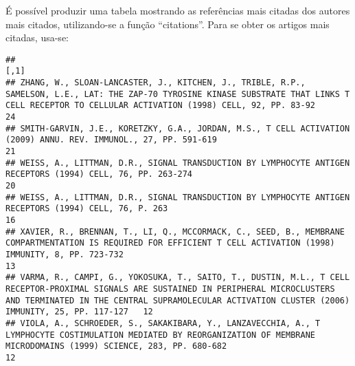 \documentclass[]{article}
\newenvironment{Shaded}{\begin{snugshade}}{\end{snugshade}}
\newcommand{\DataTypeTok}[1]{\textcolor[rgb]{0.13,0.29,0.53}{#1}}
\newcommand{\DecValTok}[1]{\textcolor[rgb]{0.00,0.00,0.81}{#1}}
\newcommand{\KeywordTok}[1]{\textcolor[rgb]{0.13,0.29,0.53}{\textbf{#1}}}
\newcommand{\NormalTok}[1]{#1}
\newcommand{\OperatorTok}[1]{\textcolor[rgb]{0.81,0.36,0.00}{\textbf{#1}}}
\newcommand{\StringTok}[1]{\textcolor[rgb]{0.31,0.60,0.02}{#1}}
\begin{document}
É possível produzir uma tabela mostrando as referências mais citadas dos
autores mais citados, utilizando-se a função ``citations''. Para se
obter os artigos mais citadas, usa-se:

\begin{Shaded}
\end{Shaded}

\begin{verbatim}
##                                                                                                                                                                                                                                          [,1]
## ZHANG, W., SLOAN-LANCASTER, J., KITCHEN, J., TRIBLE, R.P., SAMELSON, L.E., LAT: THE ZAP-70 TYROSINE KINASE SUBSTRATE THAT LINKS T CELL RECEPTOR TO CELLULAR ACTIVATION (1998) CELL, 92, PP. 83-92                                          24
## SMITH-GARVIN, J.E., KORETZKY, G.A., JORDAN, M.S., T CELL ACTIVATION (2009) ANNU. REV. IMMUNOL., 27, PP. 591-619                                                                                                                            21
## WEISS, A., LITTMAN, D.R., SIGNAL TRANSDUCTION BY LYMPHOCYTE ANTIGEN RECEPTORS (1994) CELL, 76, PP. 263-274                                                                                                                                 20
## WEISS, A., LITTMAN, D.R., SIGNAL TRANSDUCTION BY LYMPHOCYTE ANTIGEN RECEPTORS (1994) CELL, 76, P. 263                                                                                                                                      16
## XAVIER, R., BRENNAN, T., LI, Q., MCCORMACK, C., SEED, B., MEMBRANE COMPARTMENTATION IS REQUIRED FOR EFFICIENT T CELL ACTIVATION (1998) IMMUNITY, 8, PP. 723-732                                                                            13
## VARMA, R., CAMPI, G., YOKOSUKA, T., SAITO, T., DUSTIN, M.L., T CELL RECEPTOR-PROXIMAL SIGNALS ARE SUSTAINED IN PERIPHERAL MICROCLUSTERS AND TERMINATED IN THE CENTRAL SUPRAMOLECULAR ACTIVATION CLUSTER (2006) IMMUNITY, 25, PP. 117-127   12
## VIOLA, A., SCHROEDER, S., SAKAKIBARA, Y., LANZAVECCHIA, A., T LYMPHOCYTE COSTIMULATION MEDIATED BY REORGANIZATION OF MEMBRANE MICRODOMAINS (1999) SCIENCE, 283, PP. 680-682                                                                12

\end{verbatim}
\end{document}
